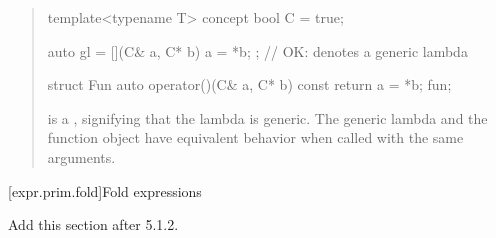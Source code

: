 \begin{quote}
\begin{addedblock}
\enterexample
\begin{codeblock}
template<typename T> concept bool C = true;

auto gl = [](C& a, C* b) { a = *b; }; // OK: denotes a generic lambda

struct Fun {
  auto operator()(C& a, C* b) const { return a = *b; }
} fun;
\end{codeblock}
 is a 
,
signifying that the lambda is generic. The generic lambda 
and the function object  have equivalent behavior when 
called with the same arguments.
\exitexample
\end{addedblock}
\end{quote}

[expr.prim.fold]{Fold expressions}

Add this section after 5.1.2.

